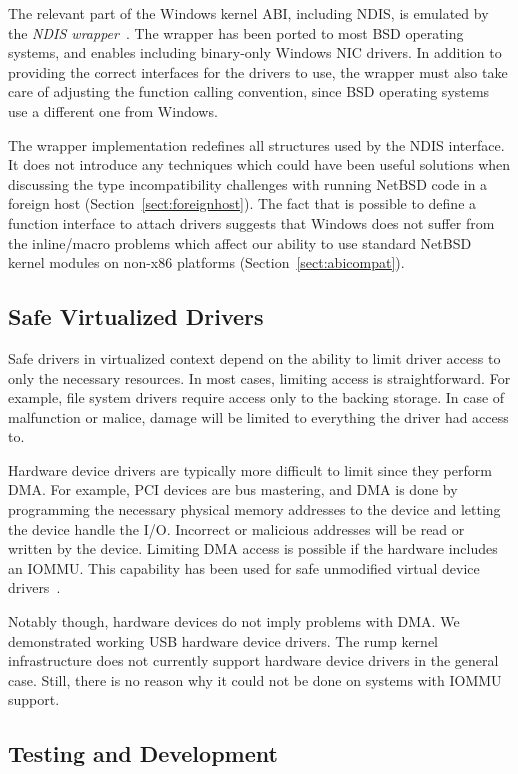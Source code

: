 The relevant part of the Windows kernel ABI, including NDIS, is
emulated by the \textit{NDIS wrapper}~\cite{ndis:fbman4}.  The
wrapper has been ported to most BSD operating systems, and enables
including binary-only Windows NIC drivers.  In addition to providing
the correct interfaces for the drivers to use, the wrapper must also
take care of adjusting the function calling convention, since BSD
operating systems use a different one from Windows.

The wrapper implementation redefines all structures used by the NDIS
interface.  It does not introduce any techniques which
could have been useful solutions when discussing the type
incompatibility challenges with running NetBSD code in a foreign host
(Section~\ref{sect:foreignhost}).  The fact that is possible to
define a function interface to attach drivers suggests that
Windows does not suffer from the inline/macro problems which affect
our ability to use standard NetBSD kernel modules on non-x86
platforms (Section~\ref{sect:abicompat}).


\subsection{Safe Virtualized Drivers}

Safe drivers in virtualized context depend on the ability to limit
driver access to only the necessary resources.  In most cases, limiting access
is straightforward.  For example, file system drivers require access
only to the backing storage.  In case of malfunction or malice,
damage will be limited to everything the driver had access to.

Hardware device drivers are typically more difficult to limit
since they perform DMA.  For example, PCI devices are bus
mastering, and DMA is done by programming the necessary physical
memory addresses to the device and letting the device handle the
I/O.  Incorrect or malicious addresses will be read or written by
the device.  Limiting DMA access is possible if the hardware includes
an IOMMU.  This capability has been used for safe unmodified virtual
device drivers~\cite{levasseur:driverreuse}.

Notably though, hardware devices do not imply problems with DMA.
We demonstrated working USB hardware device drivers.  The rump
kernel infrastructure does not currently support hardware device drivers
in the general case.  Still, there is no reason why it could not be done
on systems with IOMMU support.

\subsection{Testing and Development}

